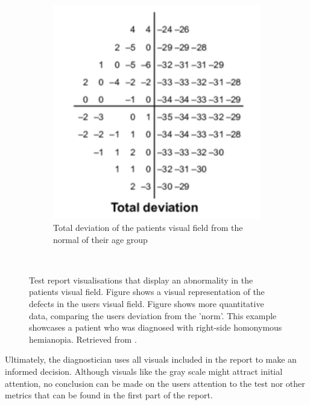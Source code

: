 \documentclass{l4proj}
\begin{document}
\begin{figure}[htbp]
\begin{subfigure}[b]{0.45\textwidth}
        \includegraphics[width=\textwidth]{dissertation/images/Total_Deviation_Example.png}
        \caption{Total deviation of the patients visual field from the normal of their age group}
        \label{fig:example_td}
    \end{subfigure}
    ~   
    \caption{Test report visualisations that display an abnormality in the patients visual field. Figure  shows a visual representation of the defects in the users visual field. Figure 
    shows more quantitative data, comparing the users deviation from the 'norm'. This example showcases a patient who was diagnosed with right-side homonymous hemianopia. Retrieved from \citet{HerroLam2015}.}\label{fig:example_result}
\end{figure}
\newline
Ultimately, the diagnostician uses all visuals included in the report to make an informed decision. Although visuals like the gray scale might attract initial attention, no conclusion can be made on the users attention to the test nor other metrics that can be found in the first part of the report. 
\end{document}
